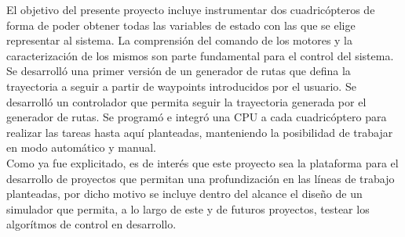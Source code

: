 \documentclass[main]{subfiles}
\begin{document}
El objetivo del presente proyecto incluye instrumentar dos cuadric\'opteros de forma de poder obtener todas las variables de estado con las que se elige representar al sistema. La comprensi\'on del comando de los motores y la caracterizaci\'on de los mismos son parte fundamental para el control del sistema. Se desarroll\'o una primer versi\'on de un generador de rutas que defina la trayectoria a seguir a partir de waypoints introducidos por el usuario. Se desarroll\'o un controlador que permita seguir la trayectoria generada por el generador de rutas. Se program\'o e integr\'o una CPU a cada cuadric\'optero para realizar las tareas hasta aqu\'i planteadas, manteniendo la posibilidad de trabajar en modo autom\'atico y manual.\\

Como ya fue explicitado, es de inter\'es que este proyecto sea la plataforma para el desarrollo de proyectos que permitan una profundizaci\'on en las l\'ineas de trabajo planteadas, por dicho motivo se incluye dentro del alcance el diseño de un simulador que permita, a lo largo de este y de futuros proyectos, testear los algor\'itmos de control en desarrollo.
\end{document}
